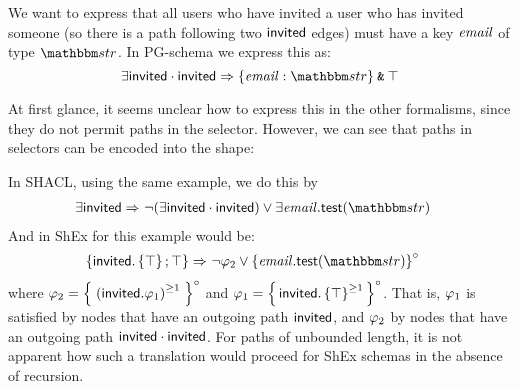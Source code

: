 \begin{example} \label{ex:PathSelector}
We want to express that all users who have invited a user who has invited someone (so there is a path following two $\mathsf{invited}$ edges) must have a key $\mathit{email}$ of type $\Exvt{str}$.
In PG-schema we express this as:
\[ \exists \exinvited \cdot \exinvited \Rightarrow \{ \exemail : \Exvt{str}  \} \tAnd \top     \]

At first glance, it seems unclear how to express this in the other formalisms, since they do not permit paths in the selector. However, we can see that paths in selectors can be encoded into the shape: 

\noindent In SHACL, using the same example, we do this by 
\begin{align*}
\exists \exinvited  \Rightarrow &\  \neg (\exists \exinvited \cdot \exinvited ) \lor  \exists \exemail . \test(\Exvt{str})      
\end{align*}
And in  ShEx for this example would be: 
\begin{align*}
\shexneigh{\exinvited.\shextop \shexeach \shexallte}  \Rightarrow &\ 
\neg \se_2
\lor \shexneighopen{\exemail.\test(\Exvt{str})}  
\end{align*}
where $\mathit{\varphi}_2 = \left\{ \;
    \left(
    \mathsf{invited}. \mathit{\varphi}_1
    \right)^{\geq 1}
\; \right\}^{\circ}$ and $\mathit{\varphi}_1 = \left\{ \,
        \mathsf{invited} . \left\{ \top \right\}^{\geq 1}
    \, \right\}^{\circ}$.
That is, $\mathit{\varphi}_1$ is satisfied by nodes that have an outgoing path $\mathsf{invited}$, and $\mathit{\varphi}_2$ by nodes that have an outgoing path $\mathsf{invited}\cdot\mathsf{invited}$.
For paths of unbounded length, it is not apparent how such a translation would proceed for ShEx schemas in the absence of recursion. 
\end{example}


